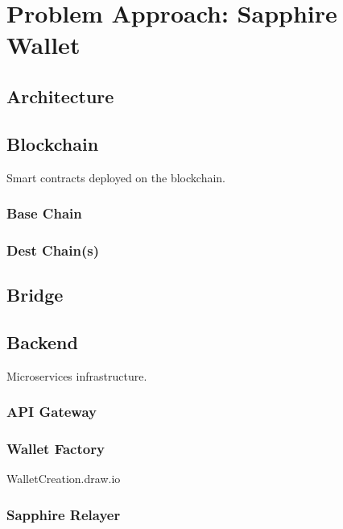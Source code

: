 \chapter{Problem Approach: Sapphire Wallet}
\label{chap:problem_approach}

\section{Architecture}
\label{sec:architecture}

\section{Blockchain}
\label{sec:blockchain}

Smart contracts deployed on the blockchain.

\subsection{Base Chain}
\label{subsec:base_chain}

\subsection{Dest Chain(s)}
\label{subsec:dest_chain(s)}

\section{Bridge}
\label{sec:bridge}

\section{Backend}
\label{sec:backend}

Microservices infrastructure.

\subsection{API Gateway}
\label{subsec:api_gateway}

\subsection{Wallet Factory}
\label{subsec:wallet_factory}

WalletCreation.draw.io

\subsection{Sapphire Relayer}
\label{subsec:sapphire_relayer}

